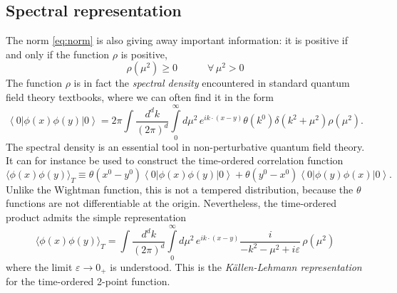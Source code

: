 \documentclass[a4paper,12pt]{article}
\newcommand{\ket}[1]{\left| #1 \right\rangle}
\newcommand{\bra}[1]{\left\langle #1 \right|}
\numberwithin{equation}{section}
\begin{document}
\subsection{Spectral representation}

The norm \eqref{eq:norm} is also giving away important information: it is positive if and only if the function $\rho$ is positive,
\begin{equation}
	\rho(\mu^2) \geq 0
	\qquad\quad
	\forall \, \mu^2 > 0
\end{equation}
The function $\rho$ is in fact the \emph{spectral density} encountered in standard quantum field theory textbooks, where we can often find it in the form
\begin{equation}
	\bra{0} \phi(x) \phi(y) \ket{0}
	= 2\pi \int \frac{d^dk}{(2\pi)^d}
	\int\limits_0^\infty d\mu^2 \,
	e^{i k \cdot (x - y)} \theta(k^0) 
	\delta(k^2 + \mu^2) \rho(\mu^2).
	\label{eq:spectralrepresentation}
\end{equation}
The spectral density is an essential tool in non-perturbative quantum field theory. It can for instance be used to construct the time-ordered correlation function
\begin{equation}
	\langle \phi(x) \phi(y) \rangle_T
	\equiv 
	\theta(x^0 - y^0) \bra{0} \phi(x) \phi(y) \ket{0}
	+ \theta(y^0 - x^0) \bra{0} \phi(y) \phi(x) \ket{0}.
\end{equation}
Unlike the Wightman function, this is not a tempered distribution, because the $\theta$ functions are not differentiable at the origin.
Nevertheless, the time-ordered product admits the simple representation
\begin{equation}
	\langle \phi(x) \phi(y) \rangle_T
	= \int \frac{d^dk}{(2\pi)^d}
	\int\limits_0^\infty d\mu^2 \,
	e^{i k \cdot (x - y)}
	\frac{i}
	{ -k^2 - \mu^2 + i \varepsilon} \, \rho(\mu^2)
	\label{eq:KallenLehmann}
\end{equation}
where the limit $\varepsilon \to 0_+$ is understood.
This is the \emph{Källen-Lehmann representation} for the time-ordered 2-point function.
%
\end{document}
